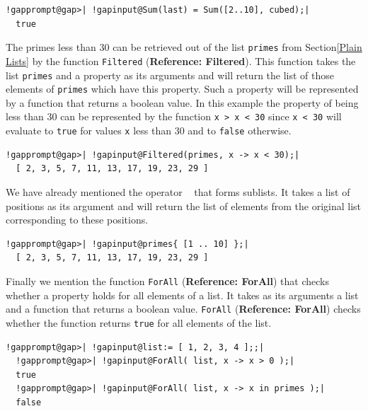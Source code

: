 \documentclass[a4paper,11pt]{report}
\begin{document}
{{ 
\begin{Verbatim}[commandchars=!@|,fontsize=\small,frame=single,label=Example]
  !gapprompt@gap>| !gapinput@Sum(last) = Sum([2..10], cubed);|
  true
\end{Verbatim}
 

 The primes less than 30 can be retrieved out of the list \texttt{primes} from Section{\nobreakspace}\ref{Plain Lists} by the function \texttt{Filtered} (\textbf{Reference: Filtered}). This function takes the list \texttt{primes} and a property as its arguments and will return the list of those elements of \texttt{primes} which have this property. Such a property will be represented by a function
that returns a boolean value. In this example the property of being less than
30 can be represented by the function \texttt{x \texttt{}{\textgreater} x {\textless} 30} since \texttt{x {\textless} 30} will evaluate to \texttt{true} for values \texttt{x} less than 30 and to \texttt{false} otherwise. 

 
\begin{Verbatim}[commandchars=!@|,fontsize=\small,frame=single,label=Example]
  !gapprompt@gap>| !gapinput@Filtered(primes, x -> x < 30);|
  [ 2, 3, 5, 7, 11, 13, 17, 19, 23, 29 ]
\end{Verbatim}
 

 We have already mentioned the operator \texttt{\texttt{} \texttt{}} that forms sublists. It takes a list of positions as its argument and will
return the list of elements from the original list corresponding to these
positions. 

 
\begin{Verbatim}[commandchars=!@|,fontsize=\small,frame=single,label=Example]
  !gapprompt@gap>| !gapinput@primes{ [1 .. 10] };|
  [ 2, 3, 5, 7, 11, 13, 17, 19, 23, 29 ]
\end{Verbatim}
 

 Finally we mention the function \texttt{ForAll} (\textbf{Reference: ForAll}) that checks whether a property holds for all elements of a list. It takes as
its arguments a list and a function that returns a boolean value. \texttt{ForAll} (\textbf{Reference: ForAll}) checks whether the function returns \texttt{true} for all elements of the list. 

 
\begin{Verbatim}[commandchars=!@|,fontsize=\small,frame=single,label=Example]
  !gapprompt@gap>| !gapinput@list:= [ 1, 2, 3, 4 ];;|
  !gapprompt@gap>| !gapinput@ForAll( list, x -> x > 0 );|
  true
  !gapprompt@gap>| !gapinput@ForAll( list, x -> x in primes );|
  false
\end{Verbatim}
 

}}
\end{document}
